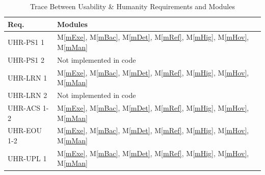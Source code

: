 \documentclass[12pt, titlepage]{article}
\newcommand{\mref}[1]{M\ref{#1}}
\begin{document}
\begin{table}[H]
  \centering
  \begin{tabular}{p{} p{}}
    \toprule \textbf{Req.} & \textbf{Modules}\\
    \midrule
    UHR-PS1 1 & \mref{mExe}, \mref{mBac}, \mref{mDet}, \mref{mRef}, \mref{mHig}, \mref{mHov}, \mref{mMan}\\ 
    UHR-PS1 2 & Not implemented in code\\ 
    UHR-LRN 1 & \mref{mExe}, \mref{mBac}, \mref{mDet}, \mref{mRef}, \mref{mHig}, \mref{mHov}, \mref{mMan}\\ 
    UHR-LRN 2 & Not implemented in code\\ 
    UHR-ACS 1-2 & \mref{mExe}, \mref{mBac}, \mref{mDet}, \mref{mRef}, \mref{mHig}, \mref{mHov}, \mref{mMan}\\ 
    UHR-EOU 1-2 & \mref{mExe}, \mref{mBac}, \mref{mDet}, \mref{mRef}, \mref{mHig}, \mref{mHov}, \mref{mMan}\\ 
    UHR-UPL 1 & \mref{mExe}, \mref{mBac}, \mref{mDet}, \mref{mRef}, \mref{mHig}, \mref{mHov}, \mref{mMan}\\ 
    \bottomrule
  \end{tabular}
  \caption{Trace Between Usability \& Humanity Requirements and Modules}
  \label{tab:UHR-mod}
\end{table}
\end{document}
